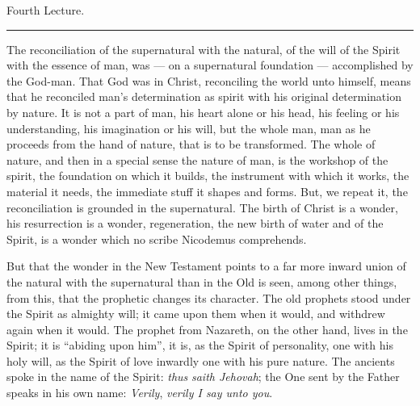 \documentclass[12pt,a4paper,openany]{book}
\newcommand{\opage}[1]{\marginnote{\footnotesize\textit{[#1]}}}
\newcommand{\lecture}[1]{\clearpage\begin{center}{\large #1}\\[0.4em]\rule{3em}{0.4pt}\end{center}\medskip\noindent}
\begin{document}
\setcounter{footnote}{0}%
\lecture{Fourth Lecture.}\opage{58}The reconciliation of the supernatural with the natural,
of the will of the Spirit with the essence of man, was --- on a
supernatural foundation --- accomplished by the God-man.
That God was in Christ, reconciling the world unto himself,
means that he reconciled man's determination as
spirit with his original determination by nature. It is
not a part of man, his heart alone or his
head, his feeling or his understanding, his imagination
or his will, but the whole man, man
as he proceeds from the hand of nature, that is to be transformed.
The whole of nature, and then in a special sense
the nature of man, is the workshop of the spirit, the foundation
on which it builds, the instrument with which it
works, the material it needs, the immediate
stuff it shapes and forms. But, we repeat it,
the reconciliation is grounded in the supernatural. The birth of Christ
is a wonder, his resurrection is a wonder, regeneration,
the new birth of water and of the Spirit, is a wonder which
no scribe Nicodemus comprehends.

But that the wonder in the New Testament points
to a far more inward union of the natural with
the supernatural than in the Old is seen, among other things,
from this, that the prophetic changes its character. The
\setcounter{footnote}{0}%
\opage{59}old prophets stood under the Spirit as almighty
will; it came upon them when it would, and withdrew
again when it would. The prophet from Nazareth,
on the other hand, lives in the Spirit; it is ``abiding upon him'',
it is, as the Spirit of personality, one with his holy
will, as the Spirit of love inwardly one with his
pure nature. The ancients spoke in the name of the Spirit: \emph{thus}
\emph{saith Jehovah}; the One sent by the Father speaks in his own
name: \emph{Verily}, \emph{verily I say unto you}.
\end{document}
